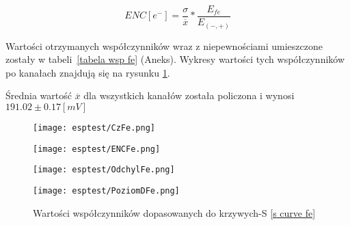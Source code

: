 \begin{equation}
        ENC [e^-] = \frac{\sigma}{\overline{x}} * \frac{E_{fe}}{E_{(-,+)}}
\end{equation}

Wartości otrzymanych współczynników wraz z niepewnościami umieszczone zostały w tabeli~\ref{tabela wsp fe} (Aneks). Wykresy wartości tych współczynników po kanałach znajdują się na rysunku \ref{wyk wsp fe}.

Średnia wartość $\overline{x}$ dla wszystkich kanałów została policzona i wynosi $191.02 \pm 0.17 [mV]$




\begin{figure}
        \begin{multicols}{2}
                \texttt{[image: esptest/CzFe.png]} \par
                \texttt{[image: esptest/ENCFe.png]} \par       
        \end{multicols} \hfill
        \begin{multicols}{2}
                \texttt{[image: esptest/OdchylFe.png]} \par
                \texttt{[image: esptest/PoziomDFe.png]} \par
        \end{multicols}
        \caption{Wartości współczynników dopasowanych do krzywych-S \ref{s curve fe}}
        \label{wyk wsp fe}
\end{figure}